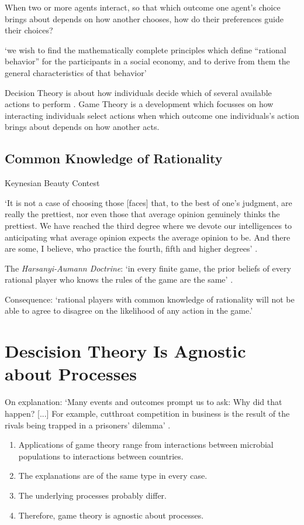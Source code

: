 \documentclass[12pt]{extarticle}
\begin{document}
\begin{multicols*}{3}
When two or more agents interact,
so that which outcome one agent’s choice brings about depends on how another chooses,
how do their preferences guide their choices?
 
‘we wish to find the mathematically complete principles which define “rational behavior” for the participants in a social economy, and to derive from them the general characteristics of that behavior’
\citep[p.~31]{neumann:1953_theory}
 
Decision Theory is about how individuals decide which of several available actions to perform
\citep[textbook:][]{Jeffrey:1983oe}.
Game Theory is a development which focusses on how interacting individuals 
select actions when 
which outcome one individuals’s action brings about depends on how another acts.
 
 
\subsection{Common Knowledge of Rationality}

Keynesian Beauty Contest

‘It is not a case of choosing those [faces] that, to the best of one's judgment, are really the prettiest, nor even those that average opinion genuinely thinks the prettiest. We have reached the third degree where we devote our intelligences to anticipating what average opinion expects the average opinion to be. And there are some, I believe, who practice the fourth, fifth and higher degrees’ \citep{keynes:1936_general}.

The \emph{Harsanyi-Aumann Doctrine}:
‘in every finite game, the prior beliefs of every rational player who knows the rules of the game are the same’ \citep{hargreaves:2004_game}.

Consequence: ‘rational players with common knowledge of rationality will not be able to agree to disagree on the likelihood of any action in the game.’
 
 
\section{Descision Theory Is Agnostic about Processes}
 
On explanation: ‘Many events and outcomes prompt us to ask: Why did that happen?  [...] For example, cutthroat competition in business is the result of the rivals being  trapped in a prisoners’ dilemma’ 
\citep[p.~36]{dixit:2014_games}.
 
\begin{enumerate}
\item Applications of game theory range from interactions between microbial populations to  interactions between countries.
\item The explanations are of the same type in every case.
\item The underlying processes probably differ.
\item Therefore, game theory is agnostic about processes.
\end{enumerate}
 

\end{multicols*}
\end{document}
